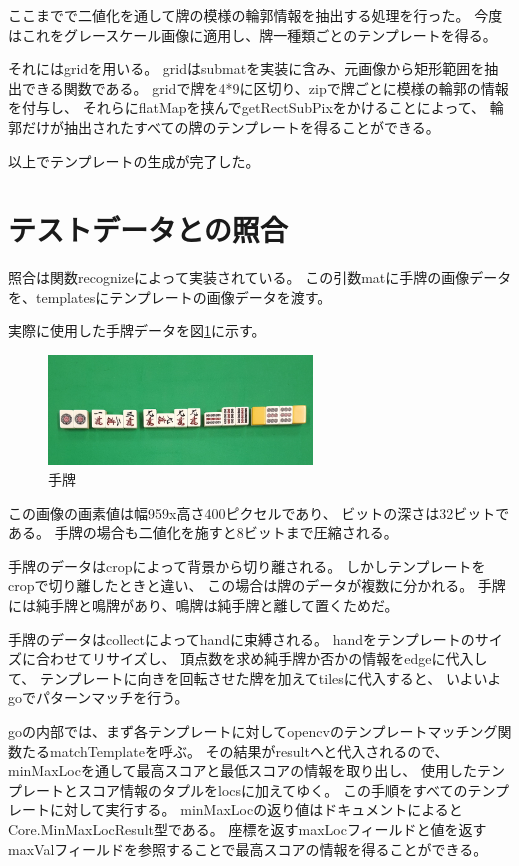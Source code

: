 \documentclass{jsarticle}
\begin{document}
\begin{multicols}{2}
ここまでで二値化を通して牌の模様の輪郭情報を抽出する処理を行った。
今度はこれをグレースケール画像に適用し、牌一種類ごとのテンプレートを得る。

それにはgridを用いる。
gridはsubmatを実装に含み、元画像から矩形範囲を抽出できる関数である。
gridで牌を4*9に区切り、zipで牌ごとに模様の輪郭の情報を付与し、
それらにflatMapを挟んでgetRectSubPixをかけることによって、
輪郭だけが抽出されたすべての牌のテンプレートを得ることができる。

以上でテンプレートの生成が完了した。

\section{テストデータとの照合}

照合は関数recognizeによって実装されている。
この引数matに手牌の画像データを、templatesにテンプレートの画像データを渡す。

実際に使用した手牌データを図\ref{fig:hand}に示す。

\begin{figure}[H]
  \begin{center}
    \includegraphics[clip,width=7.0cm]{./img/hand.png}
    \caption{手牌}
    \label{fig:hand}
  \end{center}
\end{figure}

この画像の画素値は幅959x高さ400ピクセルであり、
ビットの深さは32ビットである。
手牌の場合も二値化を施すと8ビットまで圧縮される。

手牌のデータはcropによって背景から切り離される。
しかしテンプレートをcropで切り離したときと違い、
この場合は牌のデータが複数に分かれる。
手牌には純手牌と鳴牌があり、鳴牌は純手牌と離して置くためだ。

手牌のデータはcollectによってhandに束縛される。
handをテンプレートのサイズに合わせてリサイズし、
頂点数を求め純手牌か否かの情報をedgeに代入して、
テンプレートに向きを回転させた牌を加えてtilesに代入すると、
いよいよgoでパターンマッチを行う。
	
goの内部では、まず各テンプレートに対してopencvのテンプレートマッチング関数たるmatchTemplateを呼ぶ。
その結果がresultへと代入されるので、
minMaxLocを通して最高スコアと最低スコアの情報を取り出し、
使用したテンプレートとスコア情報のタプルをlocsに加えてゆく。
この手順をすべてのテンプレートに対して実行する。
minMaxLocの返り値はドキュメントによると\cite{minMaxLoc}
Core.MinMaxLocResult型である。
座標を返すmaxLocフィールドと値を返すmaxValフィールドを参照することで最高スコアの情報を得ることができる。


\end{multicols}
\end{document}
